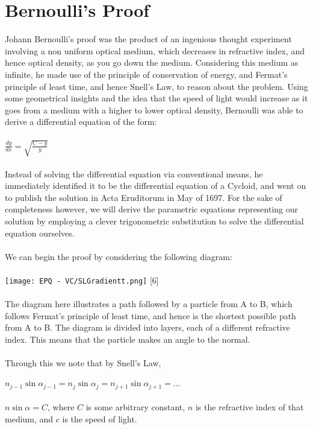 \documentclass[12pt]{report}
\begin{document}
\section{Bernoulli's Proof}
Johann Bernoulli's proof was the product of an ingenious thought experiment involving a non uniform optical medium, which decreases in refractive index, and hence optical density, as you go down the medium. Considering this medium as infinite, he made use of the principle of conservation of energy, and Fermat's principle of least time, and hence Snell's Law, to reason about the problem. Using some geometrical insights and the idea that the speed of light would increase as it goes from a medium with a higher to lower optical density, Bernoulli was able to derive a differential equation of the form:
\\
\\
\(\frac{dy}{dx} = \sqrt{\frac{C-y}{y}}\)
\\
\\
Instead of solving the differential equation via conventional means, he immediately identified it to be the differential equation of a Cycloid, and went on to publish the solution in Acta Eruditorum in May of 1697. For the sake of completeness however, we will derive the parametric equations representing our solution by employing a clever trigonometric substitution to solve the differential equation ourselves.
\\
\\
We can begin the proof by considering the following diagram:
\\
\\
\texttt{[image: EPQ - VC/SLGradientt.png]} [6]
\\
\\
The diagram here illustrates a path followed by a particle from A to B, which follows Fermat's principle of least time, and hence is the shortest possible path from A to B. The diagram is divided into layers, each of a different refractive index. This means that the particle makes an angle to the normal.
\\
\\
Through this we note that by Snell's Law,
\\
\\
\(n_{j-1}\sin{\alpha_{j-1}} = n_{j}\sin{\alpha_{j}} = n_{j+1}\sin{\alpha_{j+1}} = ...\)
\\
\\
\implies \(n\sin{\alpha} = C\), where \(C\) is some arbitrary constant, \(n\) is the refractive index of that medium, and \(c\) is the speed of light.
\end{document}
